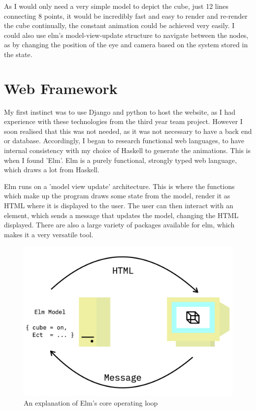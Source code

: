\documentclass{l4proj}
\begin{document}
As I would only need a very simple model to depict the cube, just 12 lines connecting 8 points, it would be incredibly fast and easy to render and re-render the cube continually, the constant animation could be achieved very easily.  I could also use elm's model-view-update structure to navigate between the nodes, as by changing the position of the eye and camera based on the system stored in the state.

\section{Web Framework}

My first instinct was to use Django and python to host the website, as I had experience with these technologies from the third year team project.  However I soon realised that this was not needed, as it was not necessary to have a back end or database.  Accordingly, I began to research functional web languages, to have internal consistency with my choice of Haskell to generate the animations.  This is when I found 'Elm'.  Elm is a purely functional, strongly typed web language, which draws a lot from Haskell.

Elm runs on a 'model view update' architecture.  This is where the functions which make up the program draws some state from the model, render it as HTML where it is displayed to the user.  The user can then interact with an element, which sends a message that updates the model, changing the HTML displayed.  There are also a large variety of packages available for elm, which makes it a very versatile tool.

\begin{figure}[h!]
    \centering
    \includegraphics[width=0.8\linewidth]{dissertation/images/elm_loop.png}
    \caption{An explanation of Elm's core operating loop}
    \label{fig:enter-label}
\end{figure}
\end{document}
